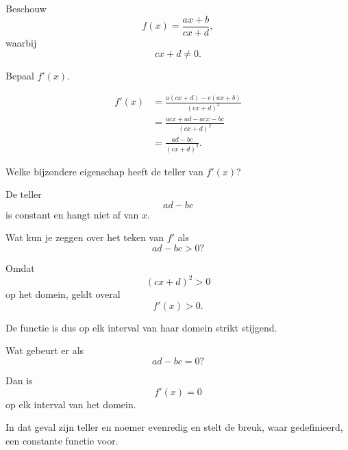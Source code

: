 \documentclass{ximera}
\begin{document}

\begin{oefening}{\oefG}

Beschouw
\[
f(x)=\frac{ax+b}{cx+d},
\]
waarbij
\[
cx+d\neq0.
\]

\begin{question}
Bepaal $f'(x)$.

\begin{oplossing}
\[
\begin{aligned}
f'(x)
&=
\frac{
a(cx+d)-c(ax+b)
}{
(cx+d)^2
}\\
&=
\frac{
acx+ad-acx-bc
}{
(cx+d)^2
}\\
&=
\boxed{
\frac{ad-bc}{(cx+d)^2}
}.
\end{aligned}
\]
\end{oplossing}
\end{question}


\begin{question}
Welke bijzondere eigenschap heeft de teller van $f'(x)$?

\begin{oplossing}
De teller
\[
ad-bc
\]
is constant en hangt niet af van $x$.
\end{oplossing}
\end{question}


\begin{question}
Wat kun je zeggen over het teken van $f'$ als
\[
ad-bc>0?
\]

\begin{oplossing}
Omdat
\[
(cx+d)^2>0
\]
op het domein, geldt overal
\[
f'(x)>0.
\]

De functie is dus op elk interval van haar domein strikt stijgend.
\end{oplossing}
\end{question}


\begin{question}
Wat gebeurt er als
\[
ad-bc=0?
\]

\begin{oplossing}
Dan is
\[
f'(x)=0
\]
op elk interval van het domein.

In dat geval zijn teller en noemer evenredig en stelt de breuk,
waar gedefinieerd, een constante functie voor.
\end{oplossing}
\end{question}

\end{oefening}
\end{document}
